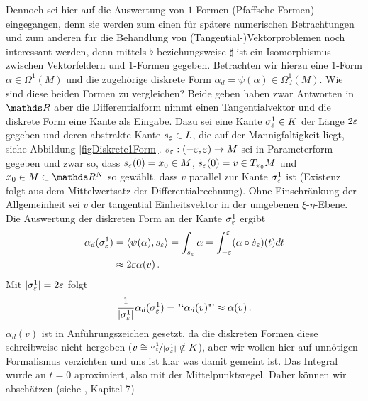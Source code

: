 \begin{bemerkung}
    Dennoch sei hier auf die Auswertung von \( 1 \)-Formen (Pfaffsche Formen) eingegangen, 
    denn sie werden zum einen für spätere numerischen Betrachtungen und zum anderen für die Behandlung von (Tangential-)Vektorproblemen
    noch interessant werden, denn mittels \( \flat \) beziehungsweise \( \sharp \) ist ein Isomorphismus zwischen Vektorfeldern und \( 1 \)-Formen gegeben.
    Betrachten wir hierzu eine \( 1 \)-Form \( \alpha\in\Omega^{1}(M) \) und die zugehörige diskrete Form \( \alpha_{d} = \psi(\alpha)\in\Omega^{1}_{d}(M) \).
    Wie sind diese beiden Formen zu vergleichen? 
    Beide geben haben zwar Antworten in \( \R \) aber die Differentialform nimmt einen Tangentialvektor und die diskrete Form eine Kante als Eingabe. 
    Dazu sei eine Kante \( \sigma^{1}_{\varepsilon} \in K\) der Länge \( 2\varepsilon \) gegeben und deren abstrakte Kante \( s_{\varepsilon}\in L \), die auf der Mannigfaltigkeit liegt, 
    siehe Abbildung \ref{figDiskrete1Form}.
    \( s_{\varepsilon}: (-\varepsilon,\varepsilon)\rightarrow M \) sei in Parameterform gegeben und zwar so, dass \( s_{\varepsilon}(0)=x_{0}\in M \), \( \dot{s}_{\varepsilon}(0) = v \in T_{x_{0}}M \) 
    und \( x_{0}\in M \subset \R^{N} \) so gewählt, dass \( v \) parallel zur Kante \( \sigma^{1}_{\varepsilon} \) ist (Existenz folgt aus dem Mittelwertsatz der Differentialrechnung).
    Ohne Einschränkung der Allgemeinheit sei \( v \) der tangential Einheitsvektor in der umgebenen \( \xi \)-\( \eta \)-Ebene.
    Die Auswertung der diskreten Form an der Kante \( \sigma^{1}_{\varepsilon} \) ergibt
    \begin{align}
        \alpha_{d}(\sigma_{\varepsilon}^{1}) &= \langle \psi(\alpha) , s_{\varepsilon} \rangle = \int_{s_{\varepsilon}}\alpha = \int_{-\varepsilon}^{\varepsilon} (\alpha \circ \dot{s}_{\varepsilon})(t) dt\\
                                 &\approx 2\varepsilon \alpha(v) \,\text{.}
    \end{align}
    Mit \( |\sigma^{1}_{\varepsilon}| = 2\varepsilon \) folgt 
    \begin{align}
    \label{eqApprox1Form}
      \frac{1}{|\sigma^{1}_{\varepsilon}|} \alpha_{d}(\sigma_{\varepsilon}^{1}) = \text{"`}\alpha_{d}(v)\text{"'} \approx \alpha(v)\,\text{.}
    \end{align}
    \( \alpha_{d}(v) \) ist in Anführungszeichen gesetzt, da die diskreten Formen diese schreibweise nicht hergeben (\( v \cong \nicefrac{\sigma^{1}_{\varepsilon}}{|\sigma^{1}_{\varepsilon}|} \notin K \)), 
    aber wir wollen hier auf unnötigen Formalismus verzichten und uns ist
    klar was damit gemeint ist.
    Das Integral wurde an \( t=0 \) aproximiert, also mit der Mittelpunktsregel.
    Daher können wir abschätzen (siehe \cite{einfNum}, Kapitel 7)

\end{bemerkung}
